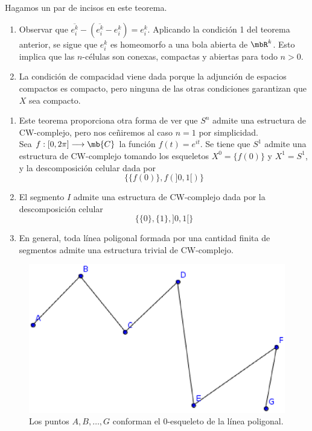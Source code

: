 Hagamos un par de incisos en este teorema.

\begin{enumerate}
\item Observar que $\overline{e^k_i}-(\overline{e^k_i}-e^k_i)=e^k_i$. Aplicando la condición 1 del teorema anterior, se sigue que $e^k_i$ es homeomorfo a una bola abierta de $\mbR^k$. Esto implica que las $n$-células son conexas, compactas y abiertas para todo $n > 0$.

\item La condición de compacidad viene dada porque la adjunción de espacios compactos es compacto, pero ninguna de las otras condiciones garantizan que $X$ sea compacto.
\end{enumerate}

\begin{ejem}
\begin{enumerate}
\item Este teorema proporciona otra forma de ver que $S^n$ admite una estructura de CW-complejo, pero nos ceñiremos al caso $n=1$ por simplicidad.
\\

Sea $f: [0,2\pi] \longrightarrow \mb{C}$ la función $f(t)=e^{it}$. Se tiene que $S^1$ admite una estructura de CW-complejo tomando los esqueletos $X^0=\{f(0)\}$ y $X^1=S^1$, y la descomposición celular dada por $$\{\{f(0)\},f(]0,1[)\}$$

\item El segmento $I$ admite una estructura de CW-complejo dada por la descomposición celular $$\{\{0\},\{1\},]0,1[\}$$

\item En general, toda línea poligonal formada por una cantidad finita de segmentos admite una estructura trivial de CW-complejo.
\end{enumerate}
\end{ejem}

\begin{figure}[h]
\centering
\includegraphics[scale=0.8]{Figures/Poligonal.eps}
\caption{Los puntos $A,B,\dots,G$ conforman el 0-esqueleto de la línea poligonal.}
\end{figure}

